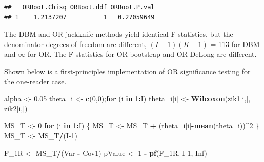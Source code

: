 \documentclass[
]{book}
\newenvironment{Shaded}{\begin{snugshade}}{\end{snugshade}}
\newcommand{\ControlFlowTok}[1]{\textcolor[rgb]{0.13,0.29,0.53}{\textbf{#1}}}
\newcommand{\DecValTok}[1]{\textcolor[rgb]{0.00,0.00,0.81}{#1}}
\newcommand{\FloatTok}[1]{\textcolor[rgb]{0.00,0.00,0.81}{#1}}
\newcommand{\KeywordTok}[1]{\textcolor[rgb]{0.13,0.29,0.53}{\textbf{#1}}}
\newcommand{\NormalTok}[1]{#1}
\newcommand{\OperatorTok}[1]{\textcolor[rgb]{0.81,0.36,0.00}{\textbf{#1}}}
\newcommand{\OtherTok}[1]{\textcolor[rgb]{0.56,0.35,0.01}{#1}}
\newcommand{\StringTok}[1]{\textcolor[rgb]{0.31,0.60,0.02}{#1}}
\begin{document}
\begin{verbatim}
##   ORBoot.Chisq ORBoot.ddf ORBoot.P.val
## 1    1.2137207          1   0.27059649
\end{verbatim}

The DBM and OR-jackknife methods yield identical F-statistics, but the denominator degrees of freedom are different, \((I-1)(K-1)\) = 113 for DBM and \(\infty\) for OR. The F-statistics for OR-bootstrap and OR-DeLong are different.

Shown below is a first-principles implementation of OR significance testing for the one-reader case.

\begin{Shaded}
\begin{Highlighting}[]
\NormalTok{alpha <-}\StringTok{ }\FloatTok{0.05}
\NormalTok{theta_i <-}\StringTok{ }\KeywordTok{c}\NormalTok{(}\DecValTok{0}\NormalTok{,}\DecValTok{0}\NormalTok{);}\ControlFlowTok{for}\NormalTok{ (i }\ControlFlowTok{in} \DecValTok{1}\OperatorTok{:}\NormalTok{I) theta_i[i] <-}\StringTok{ }\KeywordTok{Wilcoxon}\NormalTok{(zik1[i,], zik2[i,])}

\NormalTok{MS_T <-}\StringTok{ }\DecValTok{0}
\ControlFlowTok{for}\NormalTok{ (i }\ControlFlowTok{in} \DecValTok{1}\OperatorTok{:}\NormalTok{I) \{}
\NormalTok{  MS_T <-}\StringTok{ }\NormalTok{MS_T }\OperatorTok{+}\StringTok{ }\NormalTok{(theta_i[i]}\OperatorTok{-}\KeywordTok{mean}\NormalTok{(theta_i))}\OperatorTok{^}\DecValTok{2}
\NormalTok{\}}
\NormalTok{MS_T <-}\StringTok{ }\NormalTok{MS_T}\OperatorTok{/}\NormalTok{(I}\DecValTok{-1}\NormalTok{)}

\NormalTok{F_1R <-}\StringTok{ }\NormalTok{MS_T}\OperatorTok{/}\NormalTok{(Var }\OperatorTok{-}\StringTok{ }\NormalTok{Cov1)}
\NormalTok{pValue <-}\StringTok{ }\DecValTok{1} \OperatorTok{-}\StringTok{ }\KeywordTok{pf}\NormalTok{(F_1R, I}\DecValTok{-1}\NormalTok{, }\OtherTok{Inf}\NormalTok{)}


\end{Highlighting}
\end{Shaded}
\end{document}
